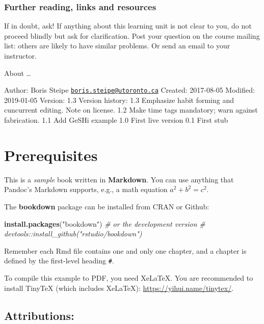 \documentclass[]{book}
\newenvironment{Shaded}{\begin{snugshade}}{\end{snugshade}}
\newcommand{\KeywordTok}[1]{\textcolor[rgb]{0.13,0.29,0.53}{\textbf{#1}}}
\newcommand{\StringTok}[1]{\textcolor[rgb]{0.31,0.60,0.02}{#1}}
\newcommand{\CommentTok}[1]{\textcolor[rgb]{0.56,0.35,0.01}{\textit{#1}}}
\newcommand{\NormalTok}[1]{#1}
\begin{document}
\subsection{Further reading, links and
resources}\label{further-reading-links-and-resources}

If in doubt, ask! If anything about this learning unit is not clear to
you, do not proceed blindly but ask for clarification. Post your
question on the course mailing list: others are likely to have similar
problems. Or send an email to your instructor.

About \ldots{}

Author: Boris Steipe
\href{mailto:boris.steipe@utoronto.ca}{\nolinkurl{boris.steipe@utoronto.ca}}
Created: 2017-08-05 Modified: 2019-01-05 Version: 1.3 Version history:
1.3 Emphasize habit forming and cuncurrent editing. Note on license. 1.2
Make time tags mandatory; warn against fabrication. 1.1 Add GeSHi
example 1.0 First live version 0.1 First stub

\chapter{Prerequisites}\label{prerequisites-1}

This is a \emph{sample} book written in \textbf{Markdown}. You can use
anything that Pandoc's Markdown supports, e.g., a math equation
\(a^2 + b^2 = c^2\).

The \textbf{bookdown} package can be installed from CRAN or Github:

\begin{Shaded}
\begin{Highlighting}[]
\KeywordTok{install.packages}\NormalTok{(}\StringTok{"bookdown"}\NormalTok{)}
\CommentTok{# or the development version}
\CommentTok{# devtools::install_github("rstudio/bookdown")}
\end{Highlighting}
\end{Shaded}

Remember each Rmd file contains one and only one chapter, and a chapter
is defined by the first-level heading \texttt{\#}.

To compile this example to PDF, you need XeLaTeX. You are recommended to
install TinyTeX (which includes XeLaTeX):
\url{https://yihui.name/tinytex/}.

\section{Attributions:}\label{attributions}
\end{document}
